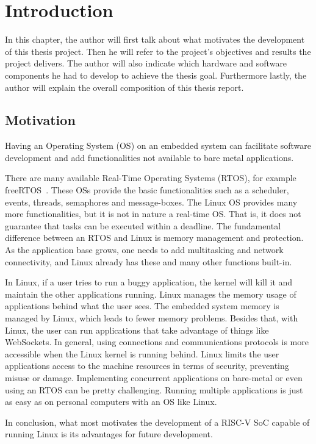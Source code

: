 \chapter{Introduction}
\label{chapter:introduction}
In this chapter, the author will first talk about what motivates the development of this thesis project. Then he will refer to the project's objectives and results the project delivers. The author will also indicate which hardware and software components he had to develop to achieve the thesis goal. Furthermore lastly, the author will explain the overall composition of this thesis report.

\section{Motivation}
\label{section:motivation}
Having an Operating System (OS) on an embedded system can facilitate software development and add functionalities not available to bare metal applications. 

There are many available Real-Time Operating Systems (RTOS), for example freeRTOS~\cite{barry2009freertos}. These OSs provide the basic functionalities such as a scheduler, events, threads, semaphores and message-boxes. The Linux OS provides many more functionalities, but it is not in nature a real-time OS. That is, it does not guarantee that tasks can be executed within a deadline. The fundamental difference between an RTOS and Linux is memory management and protection. As the application base grows, one needs to add multitasking and network connectivity, and Linux already has these and many other functions built-in.

In Linux, if a user tries to run a buggy application, the kernel will kill it and maintain the other applications running. Linux manages the memory usage of applications behind what the user sees. The embedded system memory is managed by Linux, which leads to fewer memory problems. Besides that, with Linux, the user can run applications that take advantage of things like WebSockets. In general, using connections and communications protocols is more accessible when the Linux kernel is running behind. Linux limits the user applications access to the machine resources in terms of security, preventing misuse or damage. Implementing concurrent applications on bare-metal or even using an RTOS can be pretty challenging. Running multiple applications is just as easy as on personal computers with an OS like Linux.

In conclusion, what most motivates the development of a RISC-V SoC capable of running Linux is its advantages for future development.

